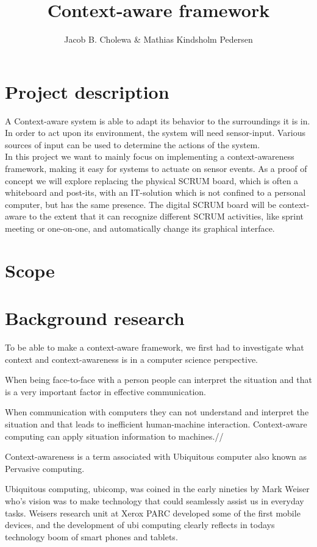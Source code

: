 \documentclass[]{report}
\title{Context-aware framework}
\author{Jacob B. Cholewa \& Mathias Kindsholm Pedersen}
\begin{document}
\maketitle

\begin{abstract}
\end{abstract}


\chapter{Project description}
A Context-aware system is able to adapt its behavior to the surroundings it is in. In order to act upon its environment, the system will need sensor-input. Various sources of input can be used to determine the actions of the system.\\

In this project we want to mainly focus on implementing a context-awareness framework, making it easy for systems to actuate on sensor events. As a proof of concept we will explore replacing the physical SCRUM board, which is often a whiteboard and post-its, with an IT-solution which is not confined to a personal computer, but has the same presence. The digital SCRUM board will be context-aware to the extent that it can recognize different SCRUM activities, like sprint meeting or one-on-one, and automatically change its graphical interface.
\chapter{Scope}
\chapter{Background research}


To be able to make a context-aware framework, we first had to investigate what context and context-awareness is in a computer science perspective.

When being face-to-face with a person people can interpret the situation and that is a very important factor in effective communication. 

When communication with computers they can not understand and interpret the situation and that leads to inefficient human-machine interaction. Context-aware computing can apply situation information to machines.//

Context-awareness is a term associated with Ubiquitous computer also known as Pervasive computing.

Ubiquitous computing, ubicomp, was coined in the early nineties by Mark Weiser who's vision was to make technology that could seamlessly assist us in everyday tasks. Weisers research unit at Xerox PARC developed some of the first mobile devices, and the development of ubi computing clearly reflects in todays technology boom of smart phones and tablets.
\end{document}
